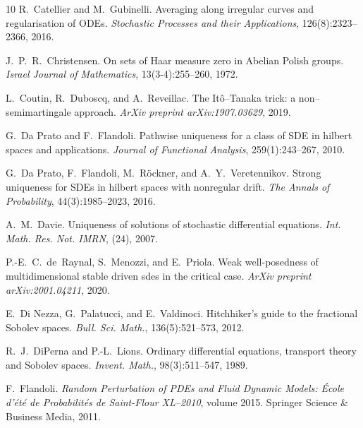 \documentclass[10pt]{article}
\newcommand{\tmtextit}[1]{{\itshape{#1}}}
\begin{document}
\begin{thebibliography}{10}
  R.~Catellier  and  M.~Gubinelli.
  {\newblock}Averaging along irregular curves and regularisation of ODEs.
  {\newblock}\tmtextit{Stochastic Processes and their Applications},
  126(8):2323--2366, 2016.{\newblock}
  
  J.~P.~R.~Christensen. {\newblock}On sets of Haar
  measure zero in Abelian Polish groups. {\newblock}\tmtextit{Israel Journal
  of Mathematics}, 13(3-4):255--260, 1972.{\newblock}
  
  L.~Coutin, R.~Duboscq, and  A.~Reveillac. {\newblock}The
  It{\^o}--Tanaka trick: a non--semimartingale approach.
  {\newblock}\tmtextit{ArXiv preprint arXiv:1907.03629}, 2019.{\newblock}
  
  G.~Da Prato  and  F.~Flandoli.
  {\newblock}Pathwise uniqueness for a class of SDE in hilbert spaces and
  applications. {\newblock}\tmtextit{Journal of Functional Analysis},
  259(1):243--267, 2010.{\newblock}
  
  G.~Da Prato, F.~Flandoli, M.~R{\"o}ckner, and 
  A.~Y.~Veretennikov. {\newblock}Strong uniqueness for SDEs in hilbert spaces
  with nonregular drift. {\newblock}\tmtextit{The Annals of Probability},
  44(3):1985--2023, 2016.{\newblock}
  
  A.~M.~Davie. {\newblock}Uniqueness of solutions of
  stochastic differential equations. {\newblock}\tmtextit{Int. Math. Res. Not.
  IMRN}, (24), 2007.{\newblock}
  
  P.-E.~C.~de~Raynal, S.~Menozzi, and  E.~Priola.
  {\newblock}Weak well-posedness of multidimensional stable driven sdes in the
  critical case. {\newblock}\tmtextit{ArXiv preprint arXiv:2001.04211},
  2020.{\newblock}
  
  E.~Di Nezza, G.~Palatucci, and  E.~Valdinoci.
  {\newblock}Hitchhiker's guide to the fractional Sobolev spaces.
  {\newblock}\tmtextit{Bull. Sci. Math.}, 136(5):521--573, 2012.{\newblock}
  
  R.~J.~DiPerna  and  P.-L.~Lions. {\newblock}Ordinary
  differential equations, transport theory and Sobolev spaces.
  {\newblock}\tmtextit{Invent. Math.}, 98(3):511--547, 1989.{\newblock}
  
  F.~Flandoli. {\newblock}\tmtextit{Random Perturbation
  of PDEs and Fluid Dynamic Models: {\'E}cole d'{\'e}t{\'e} de
  Probabilit{\'e}s de Saint-Flour XL--2010},  volume  2015.
  {\newblock}Springer Science \& Business Media, 2011.{\newblock}
  

\end{thebibliography}
\end{document}
